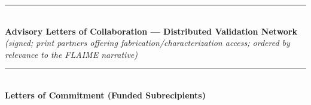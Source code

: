 \documentclass[11pt,letterpaper]{article}
\begin{document}
\bigskip
\noindent\rule{\textwidth}{0.4pt}\\
\textbf{\large Advisory Letters of Collaboration --- Distributed
Validation Network} \textit{(signed; print partners offering
fabrication/characterization access; ordered by relevance to the
FLAIME narrative)}

















\bigskip
\noindent\rule{\textwidth}{0.4pt}\\
\textbf{Letters of Commitment (Funded Subrecipients)}
\end{document}

